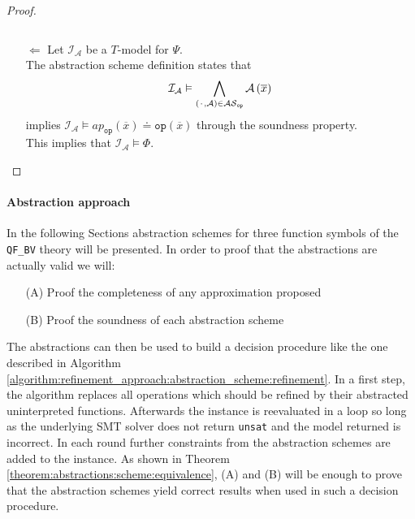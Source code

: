 \begin{theorem}
\begin{proof}
\begin{itemize}
\[        \]
    \item[$\Leftarrow$]  Let $\mathcal{I}_{\mathcal{A}}$ be a $T$-model for $\Psi$.\\
        The abstraction scheme definition states that
        \[
            \mathcal{I}_{\mathcal{A}} \vDash \bigwedge\limits_{\left({\mkern 2mu\cdot\mkern 2mu},\mathcal{A}\right)\in\mathcal{AS}_{\texttt{op}}} \mathcal{A}\left(\overline{x}\right)
        \] 
        implies $\mathcal{I}_{\mathcal{A}} \vDash ap_{\texttt{op}}\left(\overline{x}\right) \doteq \texttt{op}\left(\overline{x}\right)$ through the soundness property.\\
        This implies that $\mathcal{I}_{\mathcal{A}} \vDash \Phi$.
\end{itemize}
\end{proof}
\end{theorem}

\paragraph{Abstraction approach}
In the following Sections abstraction schemes for three function symbols of the \texttt{QF\_BV} theory will be presented.
In order to proof that the abstractions are actually valid we will:
\begin{itemize}
    \item[(A)] Proof the completeness of any approximation proposed
    \item[(B)] Proof the soundness of each abstraction scheme
\end{itemize}
The abstractions can then be used to build a decision procedure like the one described in Algorithm \ref{algorithm:refinement_approach:abstraction_scheme:refinement}.
In a first step, the algorithm replaces all operations which should be refined by their abstracted uninterpreted functions. Afterwards the instance is reevaluated in a loop so long as the underlying SMT solver does not return \texttt{unsat} and the model returned is incorrect. In each round further constraints from the abstraction schemes are added to the instance.
As shown in Theorem \ref{theorem:abstractions:scheme:equivalence}, (A) and (B) will be enough to prove that the abstraction schemes yield correct results when used in such a decision procedure.\\


